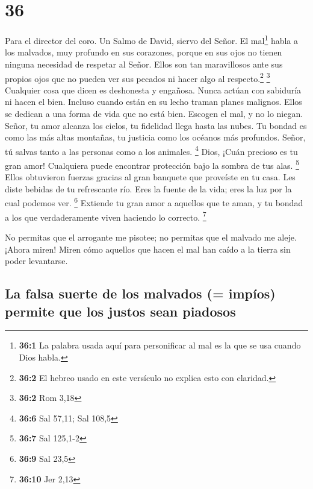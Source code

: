 \hypertarget{section-35}{%
\section{36}\label{section-35}}

Para el director del coro. Un Salmo de David, siervo del Señor.
 El mal\footnote{\textbf{36:1} La palabra usada aquí para
  personificar al mal es la que se usa cuando Dios habla.} habla a los
malvados, muy profundo en sus corazones, porque en sus ojos no tienen
ninguna necesidad de respetar al Señor.  Ellos son tan
maravillosos ante sus propios ojos que no pueden ver sus pecados ni
hacer algo al respecto.\footnote{\textbf{36:2} El hebreo usado en este
  versículo no explica esto con claridad.} \footnote{\textbf{36:2} Rom
  3,18}  Cualquier cosa que dicen es deshonesta y
engañosa. Nunca actúan con sabiduría ni hacen el bien. 
Incluso cuando están en su lecho traman planes malignos. Ellos se
dedican a una forma de vida que no está bien. Escogen el mal, y no lo
niegan.  Señor, tu amor alcanza los cielos, tu fidelidad
llega hasta las nubes.  Tu bondad es como las más altas
montañas, tu justicia como los océanos más profundos. Señor, tú salvas
tanto a las personas como a los animales. \footnote{\textbf{36:6} Sal
  57,11; Sal 108,5}  Dios, ¡Cuán precioso es tu gran amor!
Cualquiera puede encontrar protección bajo la sombra de tus alas.
\footnote{\textbf{36:7} Sal 125,1-2}  Ellos obtuvieron
fuerzas gracias al gran banquete que proveíste en tu casa. Les diste
bebidas de tu refrescante río.  Eres la fuente de la vida;
eres la luz por la cual podemos ver. \footnote{\textbf{36:9} Sal 23,5}
 Extiende tu gran amor a aquellos que te aman, y tu
bondad a los que verdaderamente viven haciendo lo correcto. \footnote{\textbf{36:10}
  Jer 2,13}

 No permitas que el arrogante me pisotee; no permitas que
el malvado me aleje.  ¡Ahora miren! Miren cómo aquellos
que hacen el mal han caído a la tierra sin poder levantarse.

\hypertarget{la-falsa-suerte-de-los-malvados-impuxedos-permite-que-los-justos-sean-piadosos}{%
\subsection{La falsa suerte de los malvados (= impíos) permite que los
justos sean
piadosos}\label{la-falsa-suerte-de-los-malvados-impuxedos-permite-que-los-justos-sean-piadosos}}

